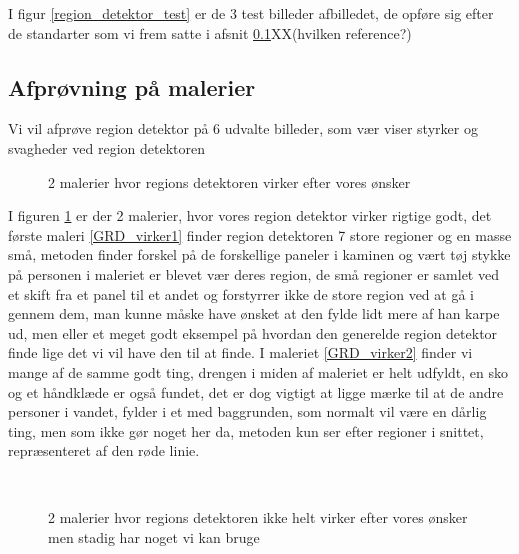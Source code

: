 I figur \ref{region_detektor_test} er de 3 test billeder afbilledet, de
opføre sig efter de standarter som vi frem satte i afsnit
\ref{}XX(hvilken reference?) 

\subsection{Afprøvning på malerier}
Vi vil afprøve region detektor på 6 udvalte billeder, som vær viser
styrker og svagheder ved region detektoren

\begin{figure}[!h]
    \centering
		\hspace{1em}
		\hspace{1em}
        \caption[]{2 malerier hvor regions detektoren virker efter vores ønsker}
     \label{generelde_region_detektor_virker}
\end{figure}

I figuren \ref{generelde_region_detektor_virker} er der 2 malerier, hvor
vores region detektor virker rigtige godt, det første maleri
\ref{GRD_virker1} finder region detektoren 7 store regioner og en masse
små, metoden finder forskel på de forskellige paneler i kaminen og vært
tøj stykke på personen i maleriet er blevet vær deres region, de små
regioner er samlet ved et skift fra et panel til et andet og forstyrrer
ikke de store region ved at gå i gennem dem, man kunne måske have ønsket
at den fylde lidt mere af han karpe ud, men eller et meget godt eksempel
på hvordan den generelde region detektor finde lige det vi vil have den
til at finde. I maleriet \ref{GRD_virker2} finder vi mange af de samme
godt ting, drengen i miden af maleriet er helt udfyldt, en sko og et
håndklæde er også fundet, det er dog vigtigt at ligge mærke til at de
andre personer i vandet, fylder i et med baggrunden, som normalt vil
være en dårlig ting, men som ikke gør noget her da, metoden kun ser
efter regioner i snittet, repræsenteret af den røde linie.
 
\begin{figure}[!h]
    \centering
		\hspace{1em}
    \\
     \label{generelde_region_detektor_virker_nesten}
     \caption[]{2 malerier hvor regions detektoren ikke helt virker efter vores ønsker men stadig har noget vi kan bruge}
\end{figure}


